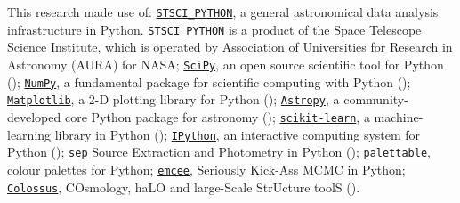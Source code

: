 \documentclass[a4paper,fleqn,usenatbib]{mnras}
\begin{document}
  This research made use of:
  \href{http://www.stsci.edu/institute/software_hardware/pyraf/stsci\_python}{\texttt{STSCI\_PYTHON}},
      a general astronomical data analysis infrastructure in Python. 
      \texttt{STSCI\_PYTHON} is a product of the Space Telescope Science Institute, 
      which is operated by Association of Universities for Research 
      in Astronomy (AURA) for NASA;
  \href{http://www.scipy.org/}{\texttt{SciPy}},
      an open source scientific tool for Python (\citealt{SciPy});
  \href{http://www.numpy.org/}{\texttt{NumPy}}, 
      a fundamental package for scientific computing with Python (\citealt{NumPy});
  \href{http://matplotlib.org/}{\texttt{Matplotlib}}, 
      a 2-D plotting library for Python (\citealt{Matplotlib});
  \href{http://www.astropy.org/}{\texttt{Astropy}}, a community-developed 
      core Python package for astronomy (\citealt{AstroPy}); 
  \href{http://scikit-learn.org/stable/index.html}{\texttt{scikit-learn}},
      a machine-learning library in Python (\citealt{scikit-learn}); 
  \href{https://ipython.org}{\texttt{IPython}}, 
      an interactive computing system for Python (\citealt{IPython});
  \href{https://github.com/kbarbary/sep}{\texttt{sep}} 
      Source Extraction and Photometry in Python (\citealt{PythonSEP});
  \href{https://jiffyclub.github.io/palettable/}{\texttt{palettable}},
      colour palettes for Python;
  \href{http://dan.iel.fm/emcee/current/}{\texttt{emcee}}, 
      Seriously Kick-Ass MCMC in Python;
  \href{http://bdiemer.bitbucket.org/}{\texttt{Colossus}}, 
      COsmology, haLO and large-Scale StrUcture toolS (\citealt{Colossus}).



\end{document}
